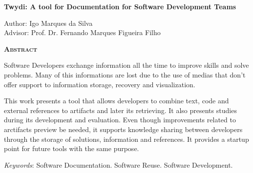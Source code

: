 \begin{center}
	{\Large{\textbf{Twydi: A tool for Documentation for Software Development Teams}}}
\end{center}

\vspace{1cm}

\begin{flushright}
	Author: Igo Marques da Silva\\
	Advisor: Prof. Dr. Fernando Marques Figueira Filho
\end{flushright}

\vspace{1cm}

\begin{center}
	\Large{\textsc{\textbf{Abstract}}}
\end{center}

\noindent Software Developers exchange information all the time to improve skills and solve problems. Many of this informations are lost due to the use of medias that don't offer support to information storage, recovery and visualization.

This work presents a tool that allows developers to combine text, code and external references to artifacts and later its retrieving. It also presents studies during its development and evaluation. Even though improvements related to arctifacts preview be needed, it supports knowledge sharing between developers through the storage of solutions, information and references. It provides a startup point for future tools with the same purpose.

\noindent\textit{Keywords}: Software Documentation. Software Reuse. Software Development.
